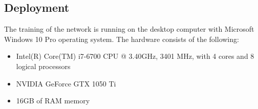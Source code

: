 \subsection{Deployment}
The training of the network is running on the desktop computer with Microsoft Windows 10 Pro operating system. The hardware consists of the following:
\begin{itemize}
    \item Intel(R) Core(TM) i7-6700 CPU @ 3.40GHz, 3401 MHz, with 4 cores and 8 logical processors 
    \item NVIDIA GeForce GTX 1050 Ti
    \item 16GB of RAM memory
\end{itemize}
